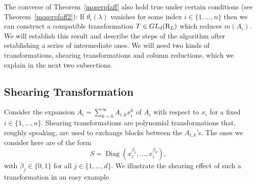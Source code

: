 \documentclass[final,1p,times,number,amsthm]{elsart}
\begin{document}
The converse of Theorem~\ref{moserpfaff} also hold true under certain conditions
(see Theorem~\ref{moserpfaff2}): If $\theta_i (\lambda)$ vanishes for some index
$i \in \{ 1, \dots, n\}$ then we can construct a compatible transformation
$T \in GL_d({\rm R}_L)$ which reduces $m(A_i)$. We will establish this result
and describe the steps of the algorithm after establishing a series of
intermediate ones. We will need two kinds of transformations, shearing
transformations and column reductions, which we explain in the next two
subsections.

\subsection{Shearing Transformation}
\label{shearpfaff}
Consider the expansion $A_i=\sum_{k=0}^\infty A_{i,k}x_i^k$ of $A_i$ with
respect to $x_i$ for a fixed $i\in\{1,\dots,n\}$. Shearing transformations are
polynomial transformations that, roughly speaking, are used to exchange blocks
between the $A_{i,k}$'s. The ones we consider here are of the form
\[S = \operatorname{Diag} (x_{i}^{\beta_1}, \dots , x_{i}^{\beta_d}),\]
with $\beta_j \in\{0,1\}$ for all $j \in\{1,\dots,d\}$.  We illustrate the
shearing effect of such a transformation in an easy example.
\end{document}
